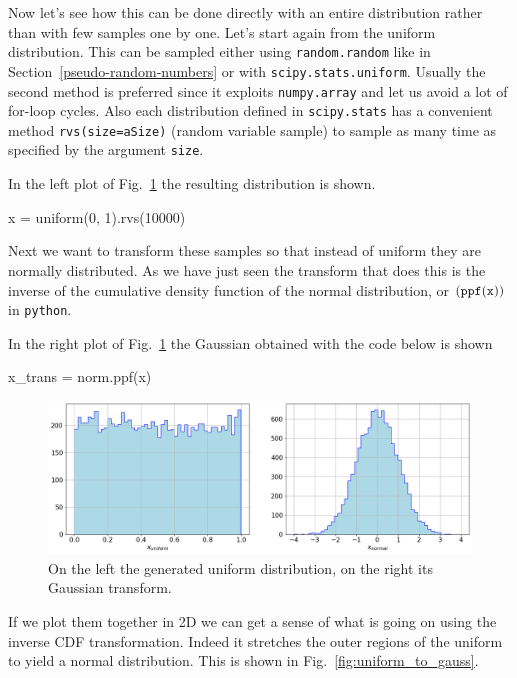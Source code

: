 Now let's see how this can be done directly with an entire distribution rather than with few samples one by one. Let's start again from the uniform distribution. This can be sampled either using \texttt{random.random} like in Section~\ref{pseudo-random-numbers} or with \texttt{scipy.stats.uniform}. Usually the second method is preferred since it exploits \texttt{numpy.array} and let us avoid a lot of for-loop cycles. 
Also each distribution defined in \texttt{scipy.stats} has a convenient method \texttt{rvs(size=aSize)} (random variable sample) to sample as many time as specified by the argument \texttt{size}. 

In the left plot of Fig.~\ref{fig:uniform_and_gauss} the resulting distribution is shown.

\begin{ipython}
x = uniform(0, 1).rvs(10000)
\end{ipython}

Next we want to transform these samples so that instead of uniform they are normally distributed. As we have just seen the transform that does this is the inverse of the cumulative density function of the normal distribution, or \((\tt{ppf(x))}\) in \texttt{python}. 

In the right plot of Fig.~\ref{fig:uniform_and_gauss} the Gaussian obtained with the code below is shown

\begin{ipython}
x_trans = norm.ppf(x)
\end{ipython}

\begin{figure}[htb]
	\centering
	\includegraphics[width=1.\textwidth]{figures/uniform_gauss}
	\caption{On the left the generated uniform distribution, on the right its Gaussian transform.}
	\label{fig:uniform_and_gauss}
\end{figure}

If we plot them together in 2D we can get a sense of what is going on using the inverse CDF transformation. Indeed it stretches the outer regions of the uniform to yield a normal distribution. This is shown in Fig.~\ref{fig:uniform_to_gauss}. 
    
